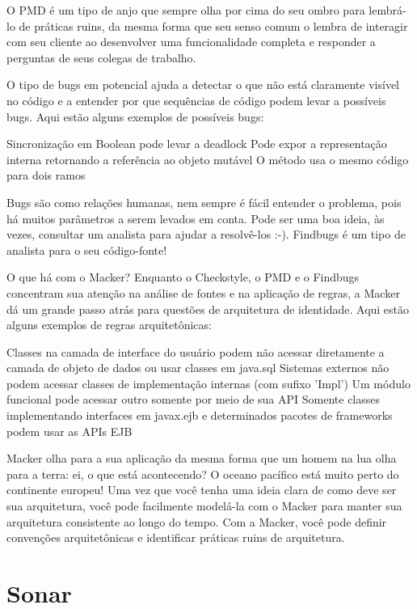 \documentclass[12pt]{article}
\begin{document}
O PMD é um tipo de anjo que sempre olha por cima do seu ombro para lembrá-lo de práticas ruins, da mesma forma que seu senso comum o lembra de interagir com seu cliente ao desenvolver uma funcionalidade completa e responder a perguntas de seus colegas de trabalho.



O tipo de bugs em potencial ajuda a detectar o que não está claramente visível no código e a entender por que sequências de código podem levar a possíveis bugs. Aqui estão alguns exemplos de possíveis bugs:

    Sincronização em Boolean pode levar a deadlock
    Pode expor a representação interna retornando a referência ao objeto mutável
    O método usa o mesmo código para dois ramos


Bugs são como relações humanas, nem sempre é fácil entender o problema, pois há muitos parâmetros a serem levados em conta. Pode ser uma boa ideia, às vezes, consultar um analista para ajudar a resolvê-los :-). Findbugs é um tipo de analista para o seu código-fonte!



O que há com o Macker? Enquanto o Checkstyle, o PMD e o Findbugs concentram sua atenção na análise de fontes e na aplicação de regras, a Macker dá um grande passo atrás para questões de arquitetura de identidade. Aqui estão alguns exemplos de regras arquitetônicas:

    Classes na camada de interface do usuário podem não acessar diretamente a camada de objeto de dados ou usar classes em java.sql
    Sistemas externos não podem acessar classes de implementação internas (com sufixo 'Impl')
    Um módulo funcional pode acessar outro somente por meio de sua API
    Somente classes implementando interfaces em javax.ejb e determinados pacotes de frameworks podem usar as APIs EJB


Macker olha para a sua aplicação da mesma forma que um homem na lua olha para a terra: ei, o que está acontecendo? O oceano pacífico está muito perto do continente europeu! Uma vez que você tenha uma ideia clara de como deve ser sua arquitetura, você pode facilmente modelá-la com o Macker para manter sua arquitetura consistente ao longo do tempo. Com a Macker, você pode definir convenções arquitetônicas e identificar práticas ruins de arquitetura.

\section{Sonar} \label{sec:sonar}
\end{document}
